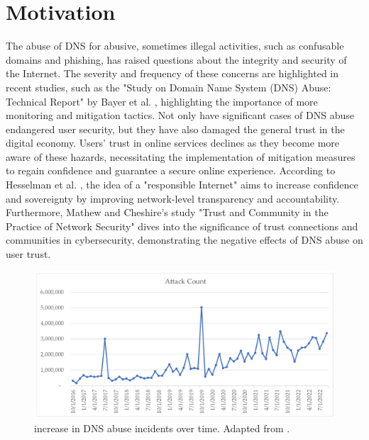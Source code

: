\section{Motivation}

 The abuse of DNS for abusive, sometimes illegal activities, such as confusable domains and phishing, has raised questions about the integrity and security of the Internet. The severity and frequency of these concerns are highlighted in recent studies, such as the "Study on Domain Name System (DNS) Abuse: Technical Report" by Bayer et al. \cite{bayer2022}, highlighting the importance of more monitoring and mitigation tactics. Not only have significant cases of DNS abuse endangered user security, but they have also damaged the general trust in the digital economy. Users' trust in online services declines as they become more aware of these hazards, necessitating the implementation of mitigation measures to regain confidence and guarantee a secure online experience. According to Hesselman et al. \cite{hesselman2020}, the idea of a "responsible Internet" aims to increase confidence and sovereignty by improving network-level transparency and accountability. Furthermore, Mathew and Cheshire's \cite{mathew2016} study "Trust and Community in the Practice of Network Security" dives into the significance of trust connections and communities in cybersecurity, demonstrating the negative effects of DNS abuse on user trust.

\begin{figure}[H]
    \centering
    \includegraphics[width=0.9\linewidth]{introduction/maliciousActivity.png}
    \caption{ increase in DNS abuse incidents over time. Adapted from \cite{Rich2023Cyberpsychology}.}
    \label{fig:dnsintro2}
\end{figure}

